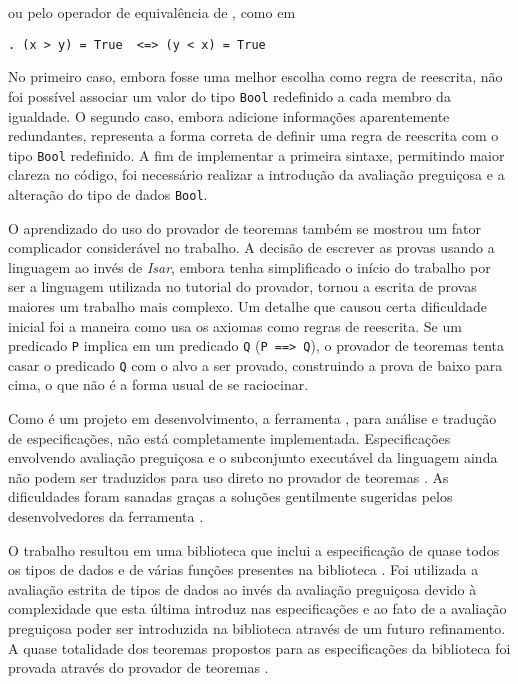 ou pelo operador de equivalência de \HasCASL, como em
\begin{Verbatim}
. (x > y) = True  <=> (y < x) = True
\end{Verbatim}

No primeiro caso, embora fosse uma melhor escolha como regra de reescrita, não foi possível associar um valor do tipo \Verb.Bool. redefinido a cada membro da igualdade.
O segundo caso, embora adicione informações aparentemente redundantes, representa a forma correta de definir uma regra de reescrita com o tipo \Verb.Bool. redefinido.
A fim de implementar a primeira sintaxe, permitindo maior clareza no código, foi necessário realizar a introdução da avaliação preguiçosa e a alteração do tipo de dados \Verb.Bool..

O aprendizado do uso do provador de teoremas \Isabelle também se mostrou um fator complicador considerável no trabalho.
A decisão de escrever as provas usando a linguagem \HOL ao invés de \textit{Isar}, embora tenha simplificado o início do trabalho por ser a linguagem utilizada no tutorial do provador, tornou a escrita de provas maiores um trabalho mais complexo.
Um detalhe que causou certa dificuldade inicial foi a maneira como \Isabelle usa os axiomas como regras de reescrita.
Se um predicado \Verb.P. implica em um predicado \Verb.Q. (\Verb.P ==> Q.), o provador de teoremas tenta casar o predicado \Verb.Q. com o alvo a ser provado, construindo a prova de baixo para cima, o que não é a forma usual de se raciocinar.

Como \HasCASL é um projeto em desenvolvimento, a ferramenta \Hets, para análise e tradução de especificações, não está completamente implementada.
Especificações envolvendo avaliação preguiçosa e o subconjunto executável da linguagem \HasCASL ainda não podem ser traduzidos para uso direto no provador de teoremas \Isabelle.
As dificuldades foram sanadas graças a soluções gentilmente sugeridas pelos desenvolvedores da ferramenta \Hets.

O trabalho resultou em uma biblioteca que inclui a especificação de quase todos os tipos de dados e de várias funções presentes na biblioteca \Prelude.
Foi utilizada a avaliação estrita de tipos de dados ao invés da avaliação preguiçosa devido à complexidade que esta última introduz nas especificações e ao fato de a avaliação preguiçosa poder ser introduzida na biblioteca através de um futuro refinamento.
A quase totalidade dos teoremas propostos para as especificações da biblioteca foi provada através do provador de teoremas \Isabelle.


